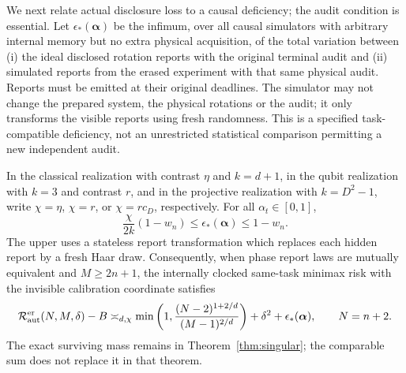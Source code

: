 We next relate actual disclosure loss to a causal deficiency; the audit condition is essential. Let $\epsilon_*(\boldsymbol\alpha)$ be the infimum, over all causal simulators with arbitrary internal memory but no extra physical acquisition, of the total variation between (i) the ideal disclosed rotation reports with the original terminal audit and (ii) simulated reports from the erased experiment with that same physical audit. Reports must be emitted at their original deadlines. The simulator may not change the prepared system, the physical rotations or the audit; it only transforms the visible reports using fresh randomness. This is a specified task-compatible deficiency, not an unrestricted statistical comparison permitting a new independent audit.

\begin{proposition}\label{prop:deficiency}
In the classical realization with contrast $\eta$ and $k=d+1$, in the qubit realization with $k=3$ and contrast $r$, and in the projective realization with $k=D^2-1$, write $\chi=\eta$, $\chi=r$, or $\chi=r c_D$, respectively. For all $\alpha_t\in[0,1]$,
\begin{equation}\label{eq:deficiency-order}
 \frac{\chi}{2k}(1-w_n)\le\epsilon_*(\boldsymbol\alpha)\le1-w_n.
\end{equation}
The upper uses a stateless report transformation which replaces each hidden report by a fresh Haar draw. Consequently, when phase report laws are mutually equivalent and $M\ge2n+1$, the internally clocked same-task minimax risk with the invisible calibration coordinate satisfies
\begin{equation}\label{eq:full-resource-law}
 \mathcal R_{\rm aut}^{\rm er}(N,M,\delta)-B
 \asymp_{d,\chi}
 \min\left(1,\frac{(N-2)^{1+2/d}}{(M-1)^{2/d}}\right)
 +\delta^2+\epsilon_*(\boldsymbol\alpha),\qquad N=n+2.
\end{equation}
The exact surviving mass remains in Theorem~\ref{thm:singular}; the comparable sum does not replace it in that theorem.
\end{proposition}
